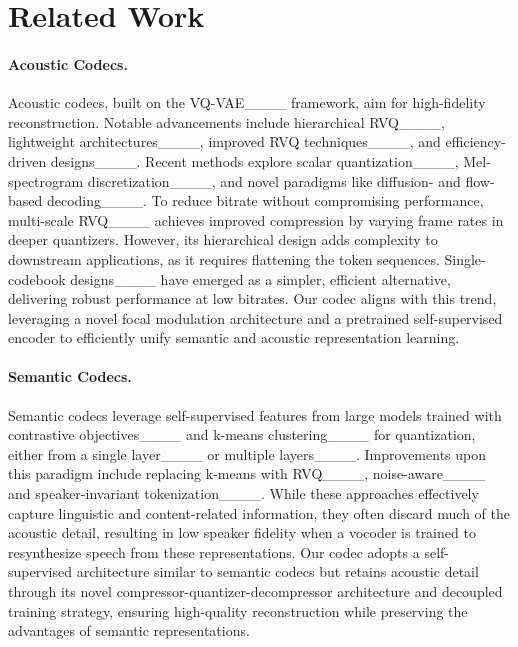 \section{Related Work}
\label{sec:related_work}

\paragraph{Acoustic Codecs.} Acoustic codecs, built on the VQ-VAE____ framework, aim for high-fidelity reconstruction. Notable advancements include hierarchical RVQ____, lightweight architectures____, improved RVQ techniques____, and efficiency-driven designs____. Recent methods explore scalar quantization____, Mel-spectrogram discretization____, and novel paradigms like diffusion- and flow-based decoding____.
To reduce bitrate without compromising performance, multi-scale RVQ____ achieves improved compression by varying frame rates in deeper quantizers. However, its hierarchical design adds complexity to downstream applications, as it requires flattening the token sequences.
Single-codebook designs____ have emerged as a simpler, efficient alternative, delivering robust performance at low bitrates. Our codec aligns with this trend, leveraging a novel focal modulation architecture and a pretrained self-supervised encoder to efficiently unify semantic and acoustic representation learning.


\paragraph{Semantic Codecs.} Semantic codecs leverage self-supervised features from large models trained with contrastive objectives____ and k-means clustering____ for quantization, either from a single layer____ or multiple layers____.
Improvements upon this paradigm include replacing k-means with RVQ____, noise-aware____ and speaker-invariant tokenization____. 
While these approaches effectively capture linguistic and content-related information, they often discard much of the acoustic detail, resulting in low speaker fidelity when a vocoder is trained to resynthesize speech from these representations.
Our codec adopts a self-supervised architecture similar to semantic codecs but retains acoustic detail through its novel compressor-quantizer-decompressor architecture and decoupled training strategy, ensuring high-quality reconstruction while preserving the advantages of semantic representations.


